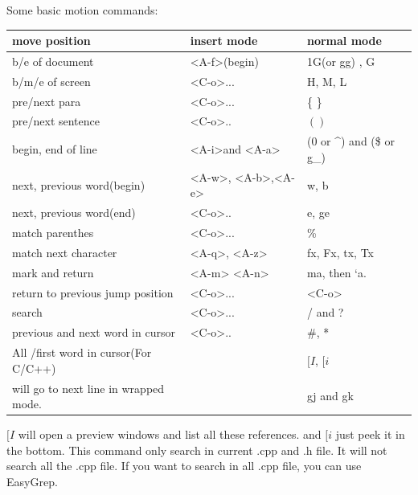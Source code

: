 \documentclass[paper=8.5in:11in, twoside, 12pt, pagesize=pdftex]{book}
\begin{document}
		
Some basic motion commands: 
		\begin{center}
			\begin{tabular}{|p{}|p{}|p{}|}
				\hline 
				move position & insert mode & \textbf{normal mode} \\
				
				\hline
				b/e of document &  <A-f>(begin)  & 1G(or gg) , G  \\
				
				\hline 
				b/m/e of screen & <C-o>... & H, M, L \\
				
				\hline 
				pre/next para & <C-o>... &\{ \} \\
				
				\hline 
				pre/next sentence & <C-o>.. & $( )$ \\
				
				\hline 
				begin, end of line &<A-i>and <A-a> & (0 or \^{}) and (\$ or g\_)  \\
				
				\hline 		
				next, previous word(begin) &<A-w>, <A-b>,<A-e>  & w, b\\   
				
				\hline
				next, previous word(end) & <C-o>.. & e, ge \\
				
				\hline 		
				match parenthes & <C-o>... & \%   \\
				
				\hline 
				match next character &<A-q>, <A-z>& fx, Fx, tx, Tx \\
				
				\hline  
				mark and return & <A-m> <A-n> & ma, then `a. \\
				
				\hline 
				return to previous jump position & <C-o>... & <C-o> \\    
				
				\hline
				search &<C-o>...  & / and ? \\
				
				\hline       
				previous and next word in cursor & <C-o>.. & \#, * \\
				
				\hline 
				All /first word in cursor(For C/C++) &  & $[I$, $[i$  \\ 
				
				\hline 
				will go to next line in wrapped mode. & &  gj and gk \\
				
				\hline 
			\end{tabular}
		\end{center} 
	$[I$ will open a preview windows and list all these references. and $[i$ just peek it in the bottom. This command only search in current .cpp and .h file.  It will not search all the .cpp file.  If you want to search in all .cpp file, you can use EasyGrep. 
		
\end{document}
